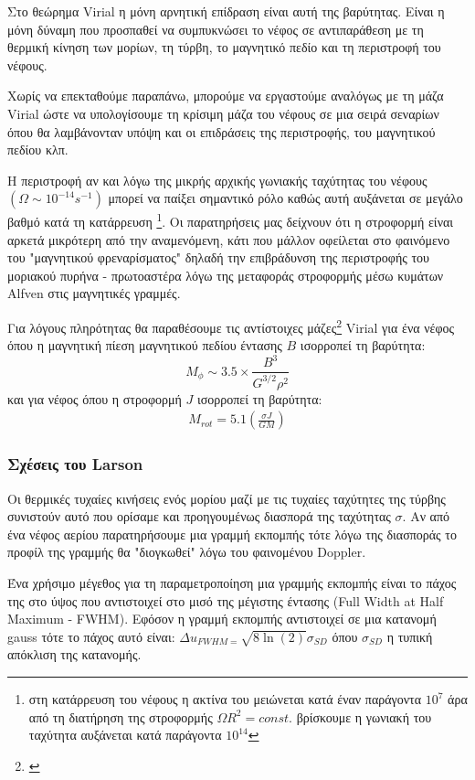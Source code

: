 \documentclass[a4paper,11pt]{memoir}
\begin{document}
Στο θεώρημα Virial η μόνη αρνητική επίδραση είναι αυτή της βαρύτητας. Είναι η μόνη δύναμη που προσπαθεί να συμπυκνώσει το νέφος σε αντιπαράθεση με τη θερμική κίνηση των μορίων, τη τύρβη, το μαγνητικό πεδίο και τη περιστροφή του νέφους.

Χωρίς να επεκταθούμε παραπάνω, μπορούμε να εργαστούμε αναλόγως με τη μάζα Virial ώστε να υπολογίσουμε τη κρίσιμη μάζα του νέφους σε μια σειρά σεναρίων όπου θα λαμβάνονταν υπόψη και οι επιδράσεις της περιστροφής, του μαγνητικού πεδίου κλπ.

Η περιστροφή αν και λόγω της μικρής αρχικής γωνιακής ταχύτητας του νέφους $(\Omega \sim 10^{-14} s^{-1})$ μπορεί να παίξει σημαντικό ρόλο καθώς αυτή αυξάνεται σε μεγάλο βαθμό κατά τη κατάρρευση \footnote{στη κατάρρευση του νέφους η ακτίνα του μειώνεται κατά έναν παράγοντα $10^7$ άρα από τη διατήρηση της στροφορμής $\Omega R^2 = const.$ βρίσκουμε η γωνιακή του ταχύτητα αυξάνεται κατά παράγοντα $10^{14}$}. Οι παρατηρήσεις μας δείχνουν ότι η στροφορμή είναι αρκετά μικρότερη από την αναμενόμενη, κάτι που μάλλον οφείλεται στο φαινόμενο του "μαγνητικού φρεναρίσματος" δηλαδή την επιβράδυνση της περιστροφής του μοριακού πυρήνα - πρωτοαστέρα λόγω της μεταφοράς στροφορμής μέσω κυμάτων Alfven στις μαγνητικές γραμμές.

Για λόγους πληρότητας θα παραθέσουμε τις αντίστοιχες μάζες\footnote{\cite{schulz_2012}} Virial για ένα νέφος όπου η μαγνητική πίεση μαγνητικού πεδίου έντασης $B$ ισορροπεί τη βαρύτητα:
\begin{equation}
M_{\phi} \sim 3.5 \times \frac{B^3}{G^{3/2} \rho^2} 
\end{equation}
και για νέφος όπου η στροφορμή $J$ ισορροπεί τη βαρύτητα:
\begin{align}
M_{rot} = 5.1 \left( \frac{\sigma J}{G M} \right) 
\end{align}

\subsubsection{Σχέσεις του Larson}
Οι θερμικές τυχαίες κινήσεις ενός μορίου μαζί με τις τυχαίες ταχύτητες της τύρβης συνιστούν αυτό που ορίσαμε και προηγουμένως διασπορά της ταχύτητας $\sigma$. Αν από ένα νέφος αερίου παρατηρήσουμε μια γραμμή εκπομπής τότε λόγω της διασποράς το προφίλ της γραμμής θα "διογκωθεί" λόγω του φαινομένου Doppler. 

Ένα χρήσιμο μέγεθος για τη παραμετροποίηση μια γραμμής εκπομπής είναι το πάχος της στο ύψος που αντιστοιχεί στο μισό της μέγιστης έντασης (Full Width at Half Maximum - FWHM). Εφόσον η γραμμή εκπομπής αντιστοιχεί σε μια κατανομή gauss τότε το πάχος αυτό είναι: $\Delta u _{FWHM = }\sqrt{8 \ln(2)} \sigma _{SD}$ όπου $\sigma _{SD}$ η τυπική απόκλιση της κατανομής. 
\end{document}

